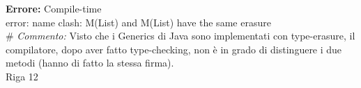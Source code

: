 \documentclass{article}
\begin{document}
\begin{tcolorbox}[
    width=\textwidth,
    height=5cm
]
\textbf{Errore:} Compile-time \\
error: name clash: M(List) and M(List) have the same erasure \\
\# \textit{Commento:} Visto che i Generics di Java sono implementati con type-erasure, il compilatore, dopo aver fatto type-checking, non è in grado di distinguere i due metodi (hanno di fatto la stessa firma). \\
Riga 12
\end{tcolorbox}
\end{document}
